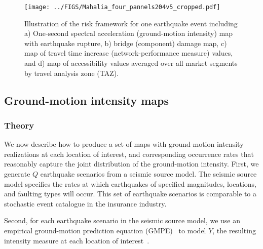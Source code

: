 \begin{sidewaysfigure}
\centering
\texttt{[image: ../FIGS/Mahalia\_four\_pannels204v5\_cropped.pdf]} %
\caption{Illustration of the risk framework for one earthquake event including a) One-second spectral acceleration  (ground-motion intensity) map with earthquake rupture, b) bridge (component) damage map, c) map of travel time increase (network-performance measure) values, and d) map of accessibility values averaged over all market segments by travel analysis zone (TAZ).}
\label{fig:four_steps}\end{sidewaysfigure}

\subsection{Ground-motion intensity maps}
\subsubsection{Theory}
We now describe how to produce a set of maps with ground-motion intensity realizations at each location of interest, and corresponding occurrence rates that reasonably capture the joint distribution of the ground-motion intensity. First, we generate $Q$ earthquake scenarios from a seismic source model. The seismic source model specifies the rates at which earthquakes of specified magnitudes, locations, and faulting types will occur. This set of earthquake scenarios is comparable to a stochastic event catalogue in the insurance industry.

Second, for each earthquake scenario in the seismic source model, we use an empirical ground-motion prediction equation (GMPE)~\cite[e.g.,][]{boore_ground-motion_2008,abrahamson_summary_2008,chiou_nga_2008,campbell_nga_2008} to model $Y$, the resulting intensity measure at each location of interest~\cite[e.g.,][]{foulser-piggott_predictive_2012}. %

